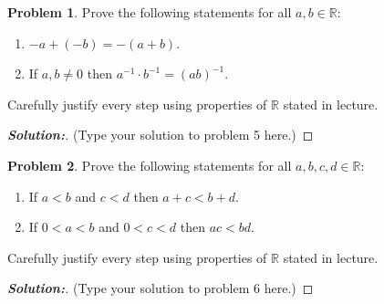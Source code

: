\documentclass[12pt]{article}
\theoremstyle{definition}\newtheorem{problem}{Problem}
\newenvironment{solution}{\begin{proof}[\bfseries\textup{Solution:}]}{\end{proof}}
\begin{document}
\newpage
\begin{problem}
Prove the following statements for all $a,b\in\mathbb{R}$:
\begin{enumerate}
\item $-a + (-b) = -(a+b)$.
\item If $a,b\neq 0$ then $a^{-1}\cdot b^{-1} = (ab)^{-1}$.
\end{enumerate}
Carefully justify every step using properties of $\mathbb{R}$ stated in lecture.
\end{problem}
\begin{solution}
(Type your solution to problem 5 here.)
\end{solution}

\newpage
\begin{problem}
Prove the following statements for all $a,b,c,d\in\mathbb{R}$:
\begin{enumerate}
\item If $a<b$ and $c<d$ then $a+c < b+d$.
\item If $0<a<b$ and $0<c<d$ then $ac<bd$.
\end{enumerate}
Carefully justify every step using properties of $\mathbb{R}$ stated in lecture.
\end{problem}
\begin{solution}
(Type your solution to problem 6 here.)
\end{solution}
\end{document}
